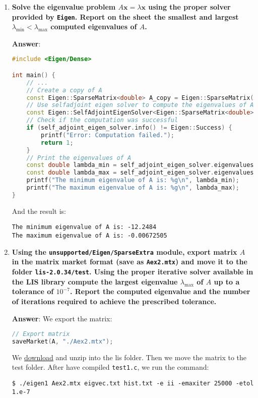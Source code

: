 \begin{enumerate}[label=\textcolor{Green3}{\textbf{\arabic*.}}]
    \newpage

    \item \textcolor{Green3}{\textbf{%
        Solve the eigenvalue problem $A\mathbf{x} = \lambda\mathbf{x}$ using the proper solver provided by \texttt{Eigen}. Report on the sheet the smallest and largest $\lambda_{\min} < \lambda_{\max}$ computed eigenvalues of $A$.
    }}

    \textbf{Answer}:
    \begin{lstlisting}[language=C++]
#include <Eigen/Dense>

int main() {
    // ...
    // Create a copy of A
    const Eigen::SparseMatrix<double> A_copy = Eigen::SparseMatrix(A);
    // Use selfadjoint eigen solver to compute the eigenvalues of A
    const Eigen::SelfAdjointEigenSolver<Eigen::SparseMatrix<double>> self_adjoint_eigen_solver(A_copy);
    // Check if the computation was successful
    if (self_adjoint_eigen_solver.info() != Eigen::Success) {
        printf("Error: Computation failed.");
        return 1;
    }
    // Print the eigenvalues of A
    const double lambda_min = self_adjoint_eigen_solver.eigenvalues()[0];
    const double lambda_max = self_adjoint_eigen_solver.eigenvalues()[n-1];
    printf("The minimum eigenvalue of A is: %g\n", lambda_min);
    printf("The maximum eigenvalue of A is: %g\n", lambda_max);
}\end{lstlisting}
    And the result is:
    \begin{lstlisting}
The minimum eigenvalue of A is: -12.2484
The maximum eigenvalue of A is: -0.00672505\end{lstlisting}


    \newpage

    \item \textcolor{Green3}{\textbf{%
        Using the \texttt{unsupported/Eigen/SparseExtra} module, export matrix $A$ in the matrix market format (save as \texttt{Aex2.mtx}) and move it to the folder \texttt{lis-2.0.34/test}. Using the proper iterative solver available in the LIS library compute the largest eigenvalue $\lambda_{\max}$ of $A$ up to a tolerance of $10^{-7}$. Report the computed eigenvalue and the number of iterations required to achieve the prescribed tolerance.
    }}

    \textbf{Answer}: We export the matrix:
    \begin{lstlisting}[language=C++]
// Export matrix
saveMarket(A, "./Aex2.mtx");\end{lstlisting}
    We \href{https://www.ssisc.org/lis/dl/lis-2.1.6.zip}{download} and unzip into the lis folder. Then we move the matrix to the test folder. After have compiled \texttt{test1.c}, we run the command:
    \begin{lstlisting}[mathescape=false]
$ ./eigen1 Aex2.mtx eigvec.txt hist.txt -e ii -emaxiter 25000 -etol 1.e-7


\end{lstlisting}
\end{enumerate}
